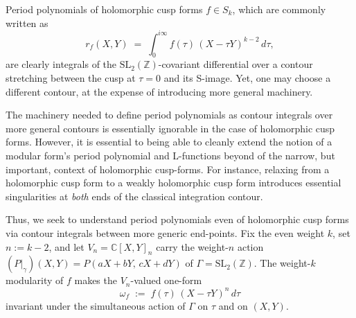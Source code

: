 \documentclass[11pt]{article}
\numberwithin{equation}{section}  %
\newcommand{\ZZ}{\mathbb{Z}}
\newcommand{\CC}{\mathbb{C}}
\newcommand{\SLZ}{\mathrm{SL}_2(\ZZ)}
\begin{document}
Period polynomials of holomorphic cusp forms $f \in S_k$, which are commonly 
written as
\begin{equation}\label{eq:classical-rf}
  r_f(X, Y) \;=\; \int_0^{i\infty}\! f(\tau)\,(X - \tau Y)^{k-2}\,d\tau,
\end{equation}
are clearly integrals of the $\SLZ$-covariant differential over a contour 
stretching between the cusp at $\tau = 0$ and its S-image. Yet, one may
choose a different contour, at the expense of introducing more general 
machinery. 

The machinery needed to define period polynomials as contour integrals over 
more general contours is essentially ignorable in the case of holomorphic cusp 
forms. However, it is essential to being able to cleanly extend the notion of a 
modular form's period polynomial and L-functions beyond of the narrow, but 
important, context of holomorphic cusp-forms. For instance, relaxing from a 
holomorphic cusp form to a weakly holomorphic cusp form introduces essential 
singularities at \emph{both} ends of the classical integration contour. 
 
Thus, we seek to understand period polynomials even 
of holomorphic cusp forms via contour integrals between more generic end-points. 
Fix the even weight $k$, set $n := k-2$, and let $V_n = \CC[X,Y]_n$ carry
the weight-$n$ action $(P|_\gamma)(X,Y) = P(aX+bY,\,cX+dY)$ of
$\Gamma = \SLZ$.  The weight-$k$ modularity of $f$ makes the $V_n$-valued
one-form
\begin{equation}\label{eq:omega-f}
  \omega_f \;:=\; f(\tau)\,(X - \tau Y)^n\,d\tau
\end{equation}
invariant under the simultaneous action of $\Gamma$ on $\tau$ and on
$(X,Y)$.
\end{document}
